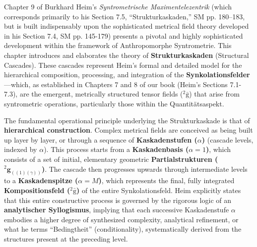 \documentclass[12pt]{article}
\newcommand{\q}[1]{\enquote{#1}}
\newcommand{\kompositionsfeld}{{}^2\bar{\mathrm{g}}}
\newcommand{\partialstruktur}[1]{{}^2\mathbf{g}_{(#1)}}
\newcommand{\kaskadenstufe}{\alpha}
\begin{document}
Chapter 9 of Burkhard Heim's \textit{Syntrometrische Maximentelezentrik} (which corresponds primarily to his Section 7.5, \q{Strukturkaskaden,} SM pp. 180–183, but is built indispensably upon the sophisticated metrical field theory developed in his Section 7.4, SM pp. 145-179) presents a pivotal and highly sophisticated development within the framework of Anthropomorphe Syntrometrie. This chapter introduces and elaborates the theory of \textbf{Strukturkaskaden} (Structural Cascades). These cascades represent Heim's formal and detailed model for the hierarchical composition, processing, and integration of the \textbf{Synkolationsfelder}—which, as established in Chapters 7 and 8 of our book (Heim's Sections 7.1-7.3), are the emergent, metrically structured tensor fields (\( \kompositionsfeld \)) that arise from syntrometric operations, particularly those within the Quantitätsaspekt.

The fundamental operational principle underlying the Strukturkaskade is that of \textbf{hierarchical construction}. Complex metrical fields are conceived as being built up layer by layer, or through a sequence of \textbf{Kaskadenstufen (\(\kaskadenstufe\))} (cascade levels, indexed by \( \alpha \)). This process starts from a \textbf{Kaskadenbasis (\( \kaskadenstufe=1 \))}, which consists of a set of initial, elementary geometric \textbf{Partialstrukturen (\( \partialstruktur{(1)(\gamma)} \))}. The cascade then progresses upwards through intermediate levels to a \textbf{Kaskadenspitze (\( \kaskadenstufe=M \))}, which represents the final, fully integrated \textbf{Kompositionsfeld (\( \kompositionsfeld \))} of the entire Synkolationsfeld. Heim explicitly states that this entire constructive process is governed by the rigorous logic of an \textbf{analytischer Syllogismus}, implying that each successive Kaskadenstufe \( \kaskadenstufe \) embodies a higher degree of synthesized complexity, analytical refinement, or what he terms \q{Bedingtheit} (conditionality), systematically derived from the structures present at the preceding level.
\end{document}
